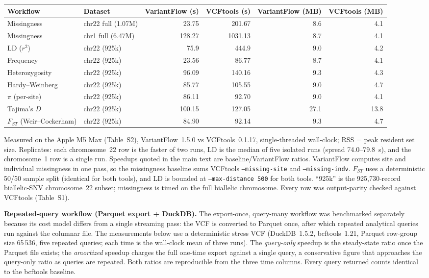 \documentclass[11pt]{article}
\begin{document}
\begin{table}[ht]
\centering
\footnotesize
\setlength{\tabcolsep}{3pt}
\begin{tabularx}{\linewidth}{llrrrr}
\toprule
Workflow & Dataset & VariantFlow (s) & VCFtools (s) & VariantFlow (MB) & VCFtools (MB) \\
\midrule
Missingness & chr22 full (1.07M) & 23.75 & 201.67 & 8.6 & 4.1 \\
Missingness & chr1 full (6.47M) & 128.27 & 1031.13 & 8.7 & 4.1 \\
LD ($r^{2}$) & chr22 (925k) & 75.9 & 444.9 & 9.0 & 4.2 \\
Frequency & chr22 (925k) & 23.56 & 86.77 & 8.7 & 4.1 \\
Heterozygosity & chr22 (925k) & 96.09 & 140.16 & 9.3 & 4.3 \\
Hardy--Weinberg & chr22 (925k) & 85.77 & 105.55 & 9.0 & 4.7 \\
$\pi$ (per-site) & chr22 (925k) & 86.11 & 92.70 & 9.0 & 4.1 \\
Tajima's $D$ & chr22 (925k) & 100.15 & 127.05 & 27.1 & 13.8 \\
$F_{ST}$ (Weir--Cockerham) & chr22 (925k) & 84.90 & 92.14 & 9.3 & 4.7 \\
\bottomrule
\end{tabularx}
\vspace{4pt}

\footnotesize{Measured on the Apple M5 Max (Table~S2), VariantFlow~1.5.0 vs
VCFtools~0.1.17, single-threaded wall-clock; RSS = peak resident set size.
Replicates: each chromosome~22 row is the faster of two runs, LD is the median
of five isolated runs (spread 74.0--79.8~s), and the chromosome~1 row is a
single run. Speedups quoted in the main text are baseline/VariantFlow ratios.
VariantFlow
computes site and individual missingness in one pass, so the missingness baseline
sums VCFtools \texttt{--missing-site} and \texttt{--missing-indv}. $F_{ST}$ uses a
deterministic 50/50 sample split (identical for both tools), and LD is bounded
at \texttt{--max-distance 500} for both tools. ``925k'' is the
925{,}730-record biallelic-SNV chromosome~22 subset; missingness is timed on the
full biallelic chromosome. Every row was output-parity checked against VCFtools
(Table~S1).}
\end{table}

\vspace{1.5em}
\noindent\textbf{Repeated-query workflow (Parquet export + DuckDB).} The
export-once, query-many workflow was benchmarked separately because its cost
model differs from a single streaming pass: the VCF is converted to Parquet
once, after which repeated analytical queries run against the columnar file. The
measurements below use a deterministic stress VCF (DuckDB~1.5.2,
bcftools~1.21, Parquet row-group size 65\,536, five repeated queries; each time
is the wall-clock mean of three runs). The \emph{query-only} speedup is the
steady-state ratio once the Parquet file exists; the \emph{amortized} speedup
charges the full one-time export against a single query, a conservative figure
that approaches the query-only ratio as queries are repeated. Both ratios are
reproducible from the three time columns. Every query returned counts identical
to the bcftools baseline.
\end{document}
